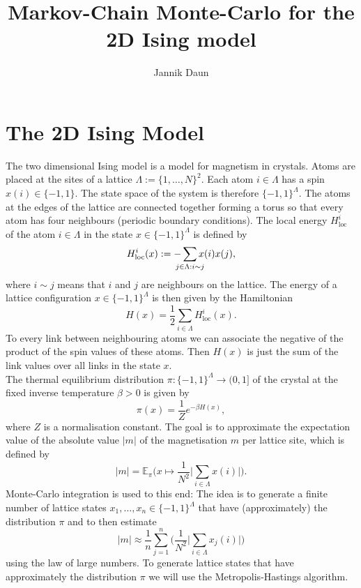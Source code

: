 \documentclass[a4paper]{article}
\title{Markov-Chain Monte-Carlo for the 2D Ising model}
\author{Jannik Daun}
\begin{document}
\maketitle

\tableofcontents

\section{The 2D Ising Model}

The two dimensional Ising model is a model for magnetism in crystals.
Atoms are placed at the sites of a lattice $\Lambda := \{1, \dots , N\}^2$.
Each atom $i \in \Lambda$ has a spin $x(i) \in \{-1, 1 \}$.
The state space of the system is therefore $\{ -1 , 1\}^\Lambda$.
The atoms at the edges of the lattice are connected together forming a torus so that every atom has four neighbours (periodic boundary conditions).
The local energy $H_{\mathrm{loc}}^i$ of the atom $i \in \Lambda$ in the state $x \in \{ -1 , 1\}^\Lambda$
is defined by 
\begin{equation*}
    H_{\mathrm{loc}}^i(x) := -\sum_{\mathclap{j \in \Lambda : i \sim j}} x(i)x(j),
\end{equation*}
where $i \sim j $ means that $i$ and $j$ are neighbours on the lattice.
The energy of a lattice configuration $x \in \{ -1 , 1\}^\Lambda$ is then given by the Hamiltonian
\begin{equation*}
    H(x) =  \frac{1}{2}\sum_{i \in \Lambda} H_{\mathrm{loc}}^i(x).
\end{equation*}
To every link between neighbouring atoms we can associate the negative of the product of the spin values of these atoms.
Then $H(x)$ is just the sum of the link values over all links in the state $x$.\\
The thermal equilibrium distribution $\pi : \{-1, 1\}^\Lambda \to (0,1]$ of the crystal at the fixed inverse temperature $\beta > 0$ is given by
\begin{equation}
    \pi(x) =  \frac{1}{Z} e^{- \beta H(x)},
\end{equation}
where $Z$ is a normalisation constant.
The goal is to approximate the expectation value of the absolute value $|m|$ of the magnetisation $m$ per lattice site, which is defined by
\begin{equation}
    |m| = \mathbb{E}_\pi \bigg ( x \mapsto  \frac{1}{N^2} \big|\sum_{i \in \Lambda} x(i)\big| \bigg ).
\end{equation}
Monte-Carlo integration is used to this end:
The idea is to generate a finite number of lattice states $x_1, \dots , x_n \in \{-1,1 \}^\Lambda$
that have (approximately) the distribution $\pi$ and to then estimate
\begin{equation}
    |m| \approx \frac{1}{n} \sum_{j=1}^n   \bigg ( \frac{1}{N^2} \big|\sum_{i \in \Lambda} x_j(i)\big| \bigg )
\end{equation}
using the law of large numbers.
To generate lattice states that have approximately the distribution $\pi$ we will use the Metropolis-Hastings algorithm.
\end{document}

